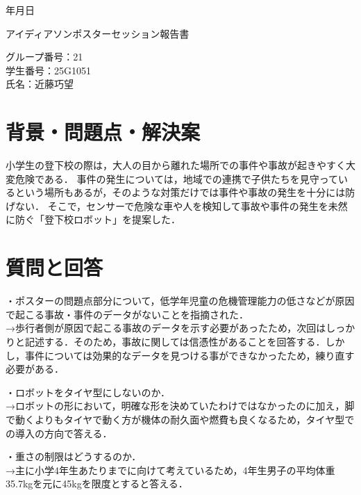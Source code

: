 \documentclass[uplatex]{jsarticle}
\begin{document}
\begin{flushright}
    \number\year 年\number\month 月\number\day 日
\end{flushright}

\begin{center}
    {\LARGE アイディアソンポスターセッション報告書}
\end{center}

\begin{flushright}
    グループ番号：21\\
    学生番号：25G1051\\
    氏名：近藤巧望
\end{flushright}


\section{背景・問題点・解決案}
小学生の登下校の際は，大人の目から離れた場所での事件や事故が起きやすく大変危険である．
事件の発生については，地域での連携で子供たちを見守っているという場所もあるが，そのような対策だけでは事件や事故の発生を十分には防げない．
そこで，センサーで危険な車や人を検知して事故や事件の発生を未然に防ぐ「登下校ロボット」を提案した．



\section{質問と回答}
・ポスターの問題点部分について，低学年児童の危機管理能力の低さなどが原因で起こる事故・事件のデータがないことを指摘された．
\\→歩行者側が原因で起こる事故のデータを示す必要があったため，次回はしっかりと記述する．そのため，事故に関しては信憑性があることを回答する．しかし，事件については効果的なデータを見つける事ができなかったため，練り直す必要がある．

・ロボットをタイヤ型にしないのか．
\\→ロボットの形において，明確な形を決めていたわけではなかったのに加え，脚で動くよりもタイヤで動く方が機体の耐久面や燃費も良くなるため，タイヤ型での導入の方向で答える．

・重さの制限はどうするのか．
\\→主に小学4年生あたりまでに向けて考えているため，4年生男子の平均体重35.7kgを元に45kgを限度とすると答える．
\end{document}
